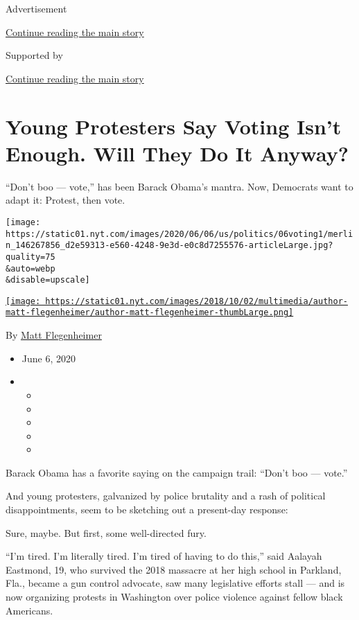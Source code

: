 Advertisement

\protect\hyperlink{after-top}{Continue reading the main story}

Supported by

\protect\hyperlink{after-sponsor}{Continue reading the main story}

\hypertarget{young-protesters-say-voting-isnt-enough-will-they-do-it-anyway}{%
\section{Young Protesters Say Voting Isn't Enough. Will They Do It
Anyway?}\label{young-protesters-say-voting-isnt-enough-will-they-do-it-anyway}}

``Don't boo --- vote,'' has been Barack Obama's mantra. Now, Democrats
want to adapt it: Protest, then vote.

\texttt{[image: https://static01.nyt.com/images/2020/06/06/us/politics/06voting1/merlin\_146267856\_d2e59313-e560-4248-9e3d-e0c8d7255576-articleLarge.jpg?quality=75\\\&auto=webp\\\&disable=upscale]}

\href{https://www.nytimes.com/by/matt-flegenheimer}{\texttt{[image: https://static01.nyt.com/images/2018/10/02/multimedia/author-matt-flegenheimer/author-matt-flegenheimer-thumbLarge.png]}}

By \href{https://www.nytimes.com/by/matt-flegenheimer}{Matt
Flegenheimer}

\begin{itemize}
\item
  June 6, 2020
\item
  \begin{itemize}
  \item
  \item
  \item
  \item
  \item
  \end{itemize}
\end{itemize}

Barack Obama has a favorite saying on the campaign trail: ``Don't boo
--- vote.''

And young protesters, galvanized by police brutality and a rash of
political disappointments, seem to be sketching out a present-day
response:

Sure, maybe. But first, some well-directed fury.

``I'm tired. I'm literally tired. I'm tired of having to do this,'' said
Aalayah Eastmond, 19, who survived the 2018 massacre at her high school
in Parkland, Fla., became a gun control advocate, saw many legislative
efforts stall --- and is now organizing protests in Washington over
police violence against fellow black Americans.

